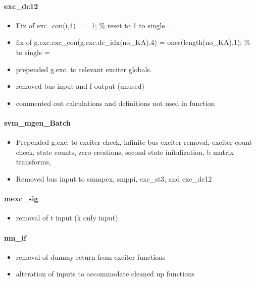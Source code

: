 \documentclass[12pt]{article}
\begin{document}
\paragraph{exc\_dc12}
	\begin{itemize}
		\item Fix of exc\_con(i,4) == 1; \% reset to 1 to single =
		\item fix of g.exc.exc\_con(g.exc.dc\_idx(no\_KA),4) = ones(length(no\_KA),1); \% to single =
		\item prepended g.exc. to relevant exciter globals.
		\item removed bus input and f output (unused)
		\item commented out calculations and definitions not used in function
	\end{itemize}
\paragraph{svm\_mgen\_Batch}
	\begin{itemize}
		\item  Prepended g.exc. to exciter check, infinite bus exciter removal, exciter count check, state counts, zero creations, second state initalization, b matrix transforms, 
		\item Removed bus input to smmpex, smppi, exc\_st3, and exc\_dc12
	\end{itemize}

\paragraph{mexc\_sig}
	\begin{itemize}
		\item  removal of t input (k only input)
	\end{itemize}

\paragraph{nm\_if}
	\begin{itemize}
		\item removal of dummy return from exciter functions
		\item alteration of inputs to accommodate cleaned up functions
	\end{itemize}
\end{document}
